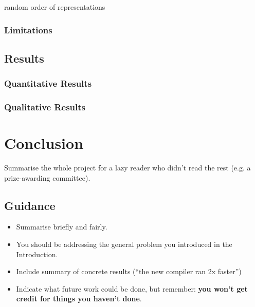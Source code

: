 \documentclass{l4proj}
\begin{document}
random order of representations

\subsection{Limitations}

\section{Results}

\citep{glen_jaccard_2022}

\subsection{Quantitative Results}


\subsection{Qualitative Results}


\chapter{Conclusion}    
Summarise the whole project for a lazy reader who didn't read the rest (e.g. a prize-awarding committee).
\section{Guidance}
\begin{itemize}
    \item
        Summarise briefly and fairly.
    \item
        You should be addressing the general problem you introduced in the
        Introduction.        
    \item
        Include summary of concrete results (``the new compiler ran 2x
        faster'')
    \item
        Indicate what future work could be done, but remember: \textbf{you
        won't get credit for things you haven't done}.
\end{itemize}

%
% 
\end{document}
